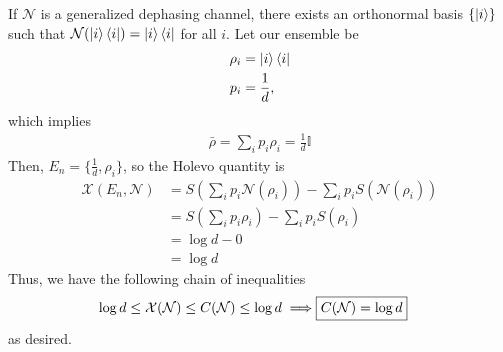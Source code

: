 \documentclass[../../note.tex]{subfiles}
\begin{document}
If $\mathcal{N}$ is a generalized dephasing channel, there exists an orthonormal basis $\{\ket{i}\}$ such that $\mathcal{N}(\ket{i}\bra{i})=\ket{i}\bra{i}$ for all $i$. Let our ensemble be 
\begin{align}
    \rho_i &= \ket{i}\bra{i} \\
    p_i &= \frac{1}{d}, 
\end{align}
which implies
\begin{align}
    \bar{\rho} = \sum_i p_i \rho_i = \frac{1}{d} \mathbb{I}
\end{align}
Then, $E_n = \{\frac{1}{d}, \rho_i \}$, so the Holevo quantity is 
\begin{align}
    \mathcal{X} (E_n, \mathcal{N}) &= S(\sum_i p_i \mathcal{N}(\rho_i))-\sum_i p_i S(\mathcal{N}(\rho_i)) \\
    &= S(\sum_i p_i \rho_i) - \sum_i p_i S(\rho_i)\\
    &=\log{d}-0 \\
    &= \log{d}
\end{align}
Thus, we have the following chain of inequalities 
\begin{align}
    \log{d} \leq \mathcal{X}(\mathcal{N}) \leq C(\mathcal{N}) \leq \log{d} \implies \Aboxed{C(\mathcal{N}) = \log{d}}
\end{align}
as desired.
\end{document}
